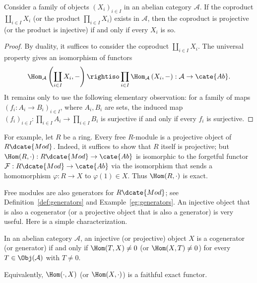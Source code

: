 \begin{lemma}\label{prop:prod-injective-projective}
Consider a family of objects $(X_i)_{i\in I}$ in an abelian category
$\mathcal{A}$. If the coproduct $\coprod_{i\in I}X_i$ (or the product
$\prod_{i\in I}X_i$) exists in $\mathcal{A}$, then the coproduct is projective
(or the product is injective) if and only if every $X_i$ is so.
\end{lemma}

\begin{proof}
By duality, it suffices to consider the coproduct $\coprod_{i\in I}X_i$. The
universal property gives an isomorphism of functors
\[
\Hom_{\mathcal{A}}\left(\coprod_{i\in I}X_i,-\right)
\rightiso\prod_{i\in I}\Hom_{\mathcal{A}}\left(X_i,-\right):
\mathcal{A}\to\cate{Ab}.
\]
It remains only to use the following elementary observation: for a family of
	maps $(f_i:A_i\to B_i)_{i\in I}$, where $A_i,B_i$ are sets, the induced map
$(f_i)_{i\in I}:\prod_{i\in I}A_i\to\prod_{i\in I}B_i$ is surjective if and
only if every $f_i$ is surjective.
\end{proof}

For example, let $R$ be a ring. Every free $R$-module is a projective object
of $R\dcate{Mod}$. Indeed, it suffices to show that $R$ itself is projective;
but $\Hom(R,\cdot):R\dcate{Mod}\to\cate{Ab}$ is isomorphic to the forgetful
functor $\mathcal{F}:R\dcate{Mod}\to\cate{Ab}$ via the isomorphism that sends
a homomorphism $\varphi:R\to X$ to $\varphi(1)\in X$. Thus
$\Hom(R,\cdot)$ is exact.

Free modules are also generators for $R\dcate{Mod}$; see
Definition~\ref{def:generators} and Example~\ref{eg:generators}. An injective
object that is also a cogenerator (or a projective object that is also a
generator) is very useful. Here is a simple characterization.

\begin{proposition}\label{prop:injective-cogenerator}
In an abelian category $\mathcal{A}$, an injective (or projective) object $X$
is a cogenerator (or generator) if and only if
$\Hom(T,X)\neq0$ (or $\Hom(X,T)\neq0$) for every
$T\in\Obj(\mathcal{A})$ with $T\neq0$.

Equivalently, $\Hom(\cdot,X)$ (or $\Hom(X,\cdot)$) is a faithful exact
functor.
\end{proposition}

